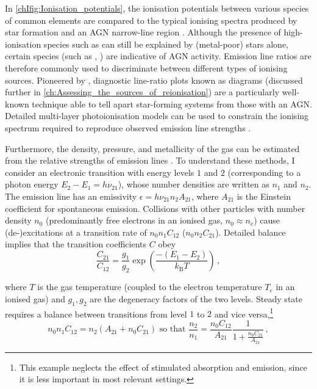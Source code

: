 In \cref{chIfig:Ionisation_potentials}, the ionisation potentials between various species of common elements are compared to the typical ionising spectra produced by star formation and an AGN narrow-line region \citep{2016MNRAS.456.3354F}. Although the presence of high-ionisation species such as  can still be explained by (metal-poor) stars alone, certain species (such as , ) are indicative of AGN activity. Emission line ratios are therefore commonly used to discriminate between different types of ionising sources. Pioneered by \citet*[;  hereafter]{1981PASP...93....5B}, diagnostic line-ratio plots known as  diagrams (discussed further in \cref{ch:Assessing_the_sources_of_reionisation}) are a particularly well-known technique able to tell apart star-forming systems from those with an AGN. Detailed multi-layer photoionisation models can be used to constrain the ionising spectrum required to reproduce observed emission line strengths \citep[e.g.][]{2021ApJ...922..170B}.

Furthermore, the density, pressure, and metallicity of the gas can be estimated from the relative strengths of emission lines \citep{2017PASP..129h2001P, 2019ARA&A..57..511K}. To understand these methods, I consider an electronic transition with energy levels $1$ and $2$ (corresponding to a photon energy $E_2 - E_1 = h \nu_{21}$), whose number densities are written as $n_1$ and $n_2$. The emission line has an emissivity $\epsilon = h \nu_{21} n_2 A_{21}$, where $A_{21}$ is the Einstein coefficient for spontaneous emission. Collisions with other particles with number density $n_0$ (predominantly free electrons in an ionised gas, $n_0 \approx n_e$) cause (de-)excitations at a transition rate of $n_0 n_1 C_{12}$ ($n_0 n_2 C_{21}$). Detailed balance implies that the transition coefficients $C$ obey
\begin{equation}
    \label{chIeq:Collisional_excitation_rates}
    \frac{C_{21}}{C_{12}} = \frac{g_1}{g_2} \exp \left( \frac{- \left( E_1 - E_2 \right)}{k_\text{B} T} \right) \, ,
\end{equation}

\noindent where $T$ is the gas temperature (coupled to the electron temperature $T_e$ in an ionised gas) and $g_1, g_2$ are the degeneracy factors of the two levels. Steady state requires a balance between transitions from level $1$ to $2$ and vice versa,\footnote{This example neglects the effect of stimulated absorption and emission, since it is less important in most relevant settings.}
\begin{equation}
    \label{chIeq:Collisional_excitation_equilibrium}
    n_0 n_1 C_{12} = n_2 \left( A_{21} + n_0 C_{21} \right) \text{ so that } \frac{n_2}{n_1} = \frac{n_0 C_{12}}{A_{21}} \frac{1}{1 + \frac{n_0 C_{21}}{A_{21}}} \, ,
\end{equation}

